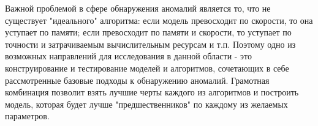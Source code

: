 \documentclass[14pt, letterpaper]{extarticle}
\begin{document}
Важной проблемой в сфере обнаружения аномалий является то, что не существует "идеального" алгоритма: если модель превосходит по скорости, то она уступает по памяти; если превосходит по памяти и скорости, то уступает по точности и затрачиваемым вычислительным ресурсам и т.п. Поэтому одно из возможных направлений для исследования в данной области - это конструирование и тестирование моделей и алгоритмов, сочетающих в себе рассмотренные базовые подходы к обнаружению аномалий. Грамотная комбинация позволит взять лучшие черты каждого из алгоритмов и построить модель, которая будет лучше "предшественников" по каждому из желаемых параметров.

\newpage


\end{document}
